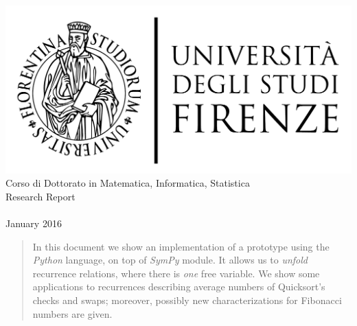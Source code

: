 \documentclass[a4paper,dottedtoc,headinclude,footinclude]{report} %
\newcommand{\myProf}{Donatella Merlini\xspace}
\theoremstyle{plain}
\begin{document}
    
    \begin{titlepage}
        \begin{center}
        \large
          \hfill
          \vfill
          \begingroup
             \includegraphics[scale=0.15]{gfx/logo/unifi}\\
                Corso di Dottorato in Matematica, Informatica, Statistica\\ 
                \vspace{0.5cm}
             \vspace{0.5cm}    
             Research Report
          \endgroup 
          \vfill 
          \begingroup
            \color{Maroon} \\ $\ $\\
        \bigskip
          \endgroup
          \vfill  
          \vfill                   
            January 2016
          \vfill                      
        \end{center}        
    \end{titlepage}   

    \begin{abstract}
        \noindent In this document we show an implementation of a prototype 
        using the \emph{Python} language, on top of \emph{SymPy} module.
        It allows us to \emph{unfold} recurrence relations, where there
        is \emph{one} free variable. We show some applications to recurrences
        describing average numbers of Quicksort's checks and swaps; moreover, 
        possibly new characterizations for Fibonacci numbers are given.
    \end{abstract}
       
\end{document}
